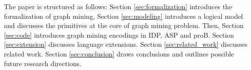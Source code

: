 The paper is structured as follows: Section \ref{sec:formalization} introduces the formalization of graph mining, Section \ref{sec:modeling} introduces a logical model and discusses the primitives at the core of graph mining problem.
Then, Section \ref{sec:code} introduces graph mining encodings in IDP, ASP and proB. Section \ref{sec:extension} discusses language extensions.
Section \ref{sec:related_work} discusses related work. Section \ref{sec:conclusion} draws conclusions and outlines possible future research directions.
